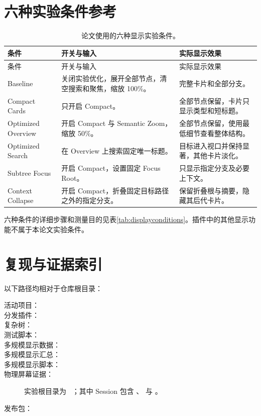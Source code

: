\chapter{六种实验条件参考}
\label{app:features}

\small
\begin{longtable}{p{}p{}p{}}
\caption{论文使用的六种显示实验条件。}\\
\toprule 条件 & 开关与输入 & 实际显示效果\\ \midrule\endfirsthead
\toprule 条件 & 开关与输入 & 实际显示效果\\ \midrule\endhead
Baseline & 关闭实验优化，展开全部节点，清空搜索和聚焦，缩放 100\%。 & 完整卡片和全部分支。\\
Compact Cards & 只开启 Compact。 & 全部节点保留，卡片只显示类型和短标题。\\
Optimized Overview & 开启 Compact 与 Semantic Zoom，缩放 50\%。 & 全部节点保留，使用最低细节查看整体结构。\\
Optimized Search & 在 Overview 上搜索固定唯一标题。 & 目标进入视口并保持显著，其他卡片淡化。\\
Subtree Focus & 开启 Compact，设置固定 Focus Root。 & 只显示指定分支及必要上下文。\\
Context Collapse & 开启 Compact，折叠固定目标路径之外的指定分支。 & 保留折叠根与摘要，隐藏其后代卡片。\\
\bottomrule
\end{longtable}

六种条件的详细步骤和测量目的见表\ref{tab:displayconditions}。插件中的其他显示功能不属于本论文实验条件。

\chapter{复现与证据索引}
\label{app:evidence}

以下路径均相对于仓库根目录：
\begin{description}
    \item[活动项目：] 
    \item[分发插件：] 
    \item[复杂树：] 
    \item[测试脚本：] 
    \item[多规模显示数据：] 
    \item[多规模显示汇总：] 
    \item[多规模显示脚本：] 
    \item[物理屏幕证据：] 实验根目录为 \ ；其中  Session 包含 、 与 。
    \item[发布包：] 
\end{description}

